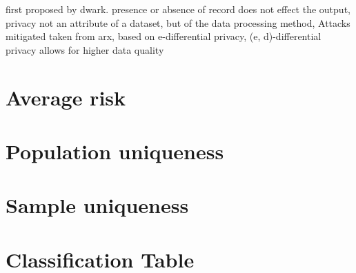 \documentclass[12pt, a4paper,oneside]{report}
\begin{document}
first proposed by dwark. presence or absence of record does not effect the output, privacy not an attribute of a dataset, but of the data processing method, Attacks mitigated taken from arx, based on e-differential
privacy, (e, d)-differential privacy allows for higher data quality

\section{Average risk}

\section{Population uniqueness}

\section{Sample uniqueness}

\section{Classification Table}
\end{document}

